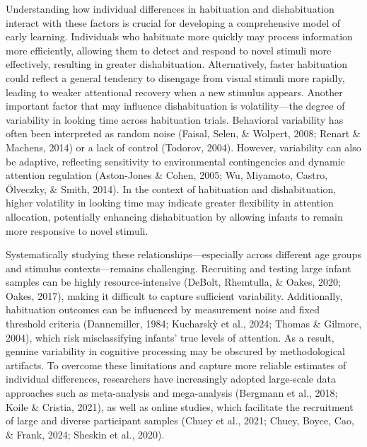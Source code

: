 \documentclass[10pt, letterpaper]{article}
\begin{document}
Understanding how individual differences in habituation and
dishabituation interact with these factors is crucial for developing a
comprehensive model of early learning. Individuals who habituate more
quickly may process information more efficiently, allowing them to
detect and respond to novel stimuli more effectively, resulting in
greater dishabituation. Alternatively, faster habituation could reflect
a general tendency to disengage from visual stimuli more rapidly,
leading to weaker attentional recovery when a new stimulus appears.
Another important factor that may influence dishabituation is
volatility---the degree of variability in looking time across
habituation trials. Behavioral variability has often been interpreted as
random noise (Faisal, Selen, \& Wolpert, 2008; Renart \& Machens, 2014)
or a lack of control (Todorov, 2004). However, variability can also be
adaptive, reflecting sensitivity to environmental contingencies and
dynamic attention regulation (Aston-Jones \& Cohen, 2005; Wu, Miyamoto,
Castro, Ölveczky, \& Smith, 2014). In the context of habituation and
dishabituation, higher volatility in looking time may indicate greater
flexibility in attention allocation, potentially enhancing
dishabituation by allowing infants to remain more responsive to novel
stimuli.

Systematically studying these relationships---especially across
different age groups and stimulus contexts---remains challenging.
Recruiting and testing large infant samples can be highly
resource-intensive (DeBolt, Rhemtulla, \& Oakes, 2020; Oakes, 2017),
making it difficult to capture sufficient variability. Additionally,
habituation outcomes can be influenced by measurement noise and fixed
threshold criteria (Dannemiller, 1984; Kucharskỳ et al., 2024; Thomas \&
Gilmore, 2004), which risk misclassifying infants' true levels of
attention. As a result, genuine variability in cognitive processing may
be obscured by methodological artifacts. To overcome these limitations
and capture more reliable estimates of individual differences,
researchers have increasingly adopted large-scale data approaches such
as meta-analysis and mega-analysis (Bergmann et al., 2018; Koile \&
Cristia, 2021), as well as online studies, which facilitate the
recruitment of large and diverse participant samples (Chuey et al.,
2021; Chuey, Boyce, Cao, \& Frank, 2024; Sheskin et al., 2020).
\end{document}

